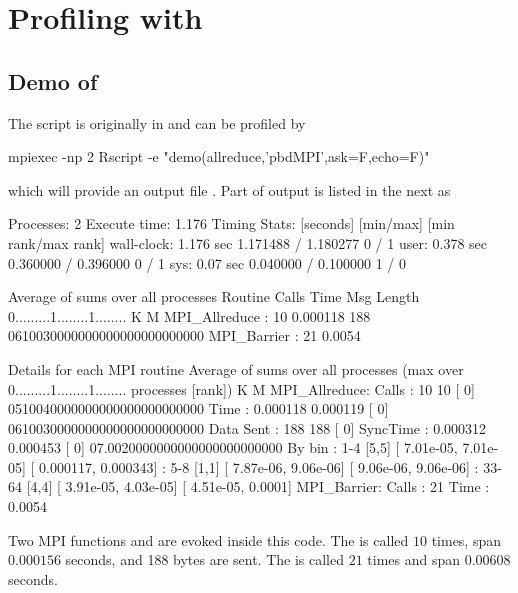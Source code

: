 \section{Profiling with }
\label{sec:ex_fpmpi}


\subsection{Demo of }

The  script is originally in  and can be profiled
by
\begin{Code}
mpiexec -np 2 Rscript -e "demo(allreduce,'pbdMPI',ask=F,echo=F)"
\end{Code}
which will provide an output file .
Part of output is listed in the next as
\begin{Output}
Processes:      2
Execute time:   1.176
Timing Stats: [seconds] [min/max]       [min rank/max rank]
wall-clock: 1.176 sec 1.171488 / 1.180277     0 / 1
user: 0.378 sec 0.360000 / 0.396000     0 / 1
sys: 0.07 sec  0.040000 / 0.100000     1 / 0

Average of sums over all processes
Routine                 Calls       Time Msg Length    %
0.........1........1........
K        M
MPI_Allreduce       :      10   0.000118        188 0610030000000000000000000000
MPI_Barrier         :      21     0.0054        

Details for each MPI routine
Average of sums over all processes
(max over          0.........1........1........
 processes [rank])           K        M
MPI_Allreduce:
  Calls     :         10           10 [   0] 0510040000000000000000000000
Time      :   0.000118     0.000119 [   0] 0610030000000000000000000000
Data Sent :        188          188 [   0]
SyncTime  :   0.000312     0.000453 [   0] 07.0020000000000000000000000
By bin    : 1-4 [5,5]   [  7.01e-05,  7.01e-05] [  0.000117,  0.000343]
: 5-8 [1,1]   [  7.87e-06,  9.06e-06] [  9.06e-06,  9.06e-06]
: 33-64       [4,4]   [  3.91e-05,  4.03e-05] [  4.51e-05,    0.0001]
MPI_Barrier:
  Calls     :         21
Time      :     0.0054
\end{Output}
Two MPI  functions  and  are
evoked inside this  code. The  is called $10$
  times, span $0.000156$ seconds, and 188 bytes are sent.
The  is called $21$ times and span $0.00608$ seconds.


